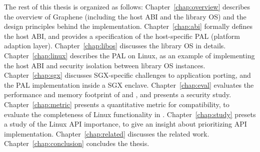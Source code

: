 The rest of this thesis is organized as follows:
Chapter~\ref{chap:overview} describes the overview of Graphene (including the host ABI and the library OS) and the design principles behind the implementation.
Chapter~\ref{chap:abi} formally defines the host ABI, and provides a specification of the host-specific PAL (platform adaption layer).
Chapter~\ref{chap:libos} discusses the library OS in details.
Chapter~\ref{chap:linux} describes the PAL on Linux, as an example of implementing the host ABI and security isolation between library OS instances.
Chapter~\ref{chap:sgx} discusses SGX-specific challenges to application porting, and the PAL implementation inside a SGX enclave.
Chapter~\ref{chap:eval} evaluates the performance and memory footprint of \graphene{} and \graphenesgx{},
and presents a security study.
Chapter~\ref{chap:metric} presents a quantitative metric for compatibility,
to evaluate the completeness of Linux functionality in \graphene{}.
Chapter~\ref{chap:study} presets a study of the Linux API importance, to give an insight about prioritizing API implementation.
Chapter~\ref{chap:related} discusses the related work.
Chapter~\ref{chap:conclusion} concludes the thesis.
